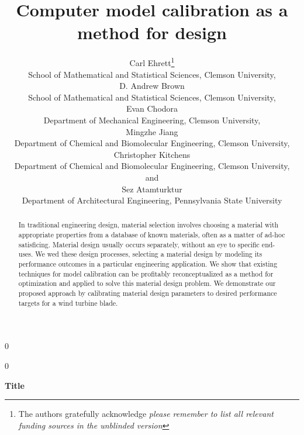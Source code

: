 \documentclass[12pt]{article}
\newcommand{\blind}{0}
\begin{document}
%

\def\spacingset#1{\renewcommand{\baselinestretch}%
{#1}\small\normalsize} \spacingset{1}



\blind
{
  \title{\bf Computer model calibration as a method for design}
  \author{Carl Ehrett\thanks{
    The authors gratefully acknowledge \textit{please remember to list all relevant funding sources in the unblinded version}}\hspace{.2cm}\\
    School of Mathematical and Statistical Sciences, Clemson University,\\
    D. Andrew Brown \\
    School of Mathematical and Statistical Sciences, Clemson University,\\
    Evan Chodora \\
    Department of Mechanical Engineering, Clemson University,\\
    Mingzhe Jiang \\
    Department of Chemical and Biomolecular Engineering, Clemson University,\\
    Christopher Kitchens \\
    Department of Chemical and Biomolecular Engineering, Clemson University,\\
    and \\
    Sez Atamturktur \\
    Department of Architectural Engineering, Pennsylvania State University\\}
  \maketitle
} \fi

\blind
{
  \bigskip
  \bigskip
  \bigskip
  \begin{center}
    {\LARGE\bf Title}
\end{center}
  \medskip
} \fi

\bigskip
\begin{abstract}
In traditional engineering design, material selection involves choosing a material with appropriate properties from a database of known materials, often as a matter of ad-hoc satisficing. 
%
Material design usually occurs separately, without an eye to specific end-uses. We wed these design processes, selecting a material design by modeling its performance outcomes in a particular engineering application.
%
 We show that existing techniques for model calibration can be profitably reconceptualized as a method for optimization and applied to solve this material design problem. 
%
We demonstrate our proposed approach by calibrating material design parameters to desired performance targets for a wind turbine blade.
\end{abstract}
\end{document}
